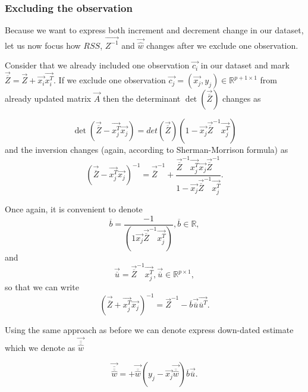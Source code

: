 
\subsubsection*{Excluding the observation}

Because we want to express both increment and decrement change in our dataset, let us now focus how $RSS$, $\vec{Z^{-1}}$ and $\vec{\hat{w}}$  changes after we exclude one observation. 

Consider that we already included one observation $\vec{c_i}$ in our dataset and mark $\vec{\overline{Z}} = \vec{Z} + \vec{x_i} \vec{x_i^T} $. If we exclude one observation $\vec{c_j} = (\vec{x_j}, y_j) \in \mathbb{R}^{p+1 \times 1} $ from already updated matrix $\vec{A}$ then the determinant $\det(\vec{\overline{Z}})$  changes as

\begin{equation} 
    \det(\vec{\overline{Z}} - \vec{x_j^T}\vec{x_j}) = det(\vec{\overline{Z}})(1 - \vec{x_j}\vec{\overline{Z}}^{-1}\vec{x_j^T})
\end{equation}
and the inversion changes (again, according to Sherman-Morrison formula) as 
\begin{equation}  
    (\vec{\overline{Z}} - \vec{x_j^T}\vec{x_j})^{-1} = \vec{\overline{Z}}^{-1} + \dfrac{\vec{\overline{Z}}^{-1}\vec{x_j^T}\vec{x_j}\vec{\overline{Z}}^{-1}}{1 - \vec{x_j}\vec{\overline{Z}}^{-1}\vec{x_j^T}}.
\end{equation}

Once again, it is convenient to denote
\begin{equation}
    \overline{b} = \dfrac{-1}{(1  \vec{x_j}\vec{\overline{Z}}^{-1}\vec{x_j^T})},  \overline{b} \in \mathbb{R},
\end{equation}
and 
\begin{equation}
    \vec{\overline{u}} = \vec{\overline{Z}}^{-1}\vec{x_j^T},      \vec{\overline{u}} \in \mathbb{R}^{p \times 1},
\end{equation}
so that we can write
\begin{equation} \label{updatedinversion2}
    (\vec{\overline{Z}} + \vec{x_j^T}\vec{x_j})^{-1} = \vec{Z}^{-1} - \overline{b}\vec{\overline{u}}\vec{\overline{u}^T}.
\end{equation}

Using the same approach as before we can denote express down-dated estimate which we denote as $\vec{\overline{\overline{\hat{w}}}}$

\begin{equation} \label{thetaminus}
    \vec{\overline{\overline{\hat{w}}}} =  +\vec{\overline{\hat{w}}} (y_j - \vec{x_j}\vec{\overline{\hat{w}}}) \overline{b} \vec{\overline{u}}.
\end{equation}

